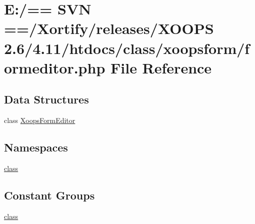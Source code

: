 \hypertarget{formeditor_8php}{\section{E\-:/== S\-V\-N ==/\-Xortify/releases/\-X\-O\-O\-P\-S 2.6/4.11/htdocs/class/xoopsform/formeditor.php File Reference}
\label{formeditor_8php}
}
\subsection*{Data Structures}
\begin{DoxyCompactItemize}
\item 
class \hyperlink{class_xoops_form_editor}{Xoops\-Form\-Editor}
\end{DoxyCompactItemize}
\subsection*{Namespaces}
\begin{DoxyCompactItemize}
\item 
\hyperlink{namespaceclass}{class}
\end{DoxyCompactItemize}
\subsection*{Constant Groups}
\begin{DoxyCompactItemize}
\item 
\hyperlink{namespaceclass}{class}
\end{DoxyCompactItemize}
